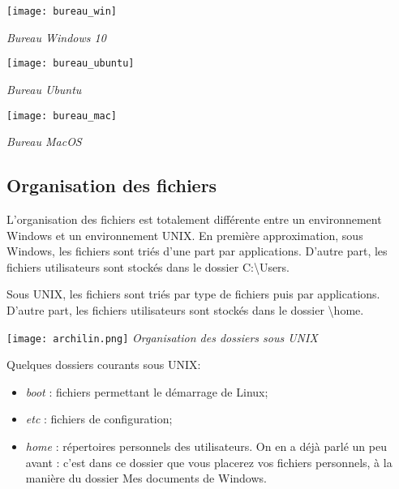 \begin{minipage}[c]{.3\linewidth}
\begin{center}
\texttt{[image: bureau\_win]}

\textit{Bureau Windows 10}
\end{center}
\end{minipage} \hfill
\begin{minipage}[c]{.3\linewidth}
\begin{center}
\texttt{[image: bureau\_ubuntu]}

\textit{Bureau Ubuntu}
\end{center}
\end{minipage} \hfill
\begin{minipage}[c]{.3\linewidth}
\begin{center}
\texttt{[image: bureau\_mac]}

\textit{Bureau MacOS}
\end{center}
\end{minipage} 

\subsection{Organisation des fichiers}
L'organisation des fichiers est totalement différente entre un environnement Windows et un environnement UNIX. 
En première approximation, sous Windows, les fichiers sont triés d'une part par applications. D'autre part, les fichiers utilisateurs sont stockés dans le dossier C:\textbackslash Users.

Sous UNIX, les fichiers sont triés par type de fichiers puis par applications. D'autre part, les fichiers utilisateurs sont stockés dans le dossier \textbackslash home.


\begin{minipage}[c]{.49\linewidth}
\begin{center}
\texttt{[image: archilin.png]}
\textit{Organisation des dossiers sous UNIX}
\end{center}
\end{minipage} \hfill
\begin{minipage}[c]{.49\linewidth}

Quelques dossiers courants sous UNIX:
\begin{itemize}
\item \textit{boot} : fichiers permettant le démarrage de Linux;
\item \textit{etc} : fichiers de configuration;
\item \textit{home} : répertoires personnels des utilisateurs. On en a déjà parlé un peu avant : c'est dans ce dossier que vous placerez vos fichiers personnels, à la manière du dossier Mes documents de Windows.
\end{itemize}
\end{minipage}

